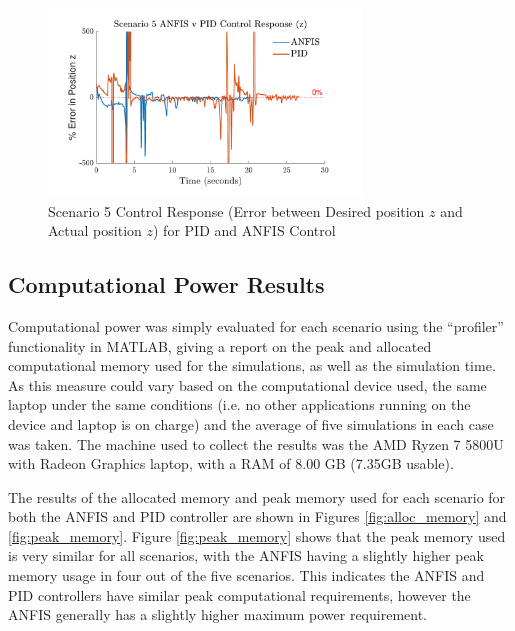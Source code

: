 \begin{figure}[H]
    \centering
    \begin{minipage}[b]{0.45\textwidth}
    \end{minipage}
    \hfill
    \begin{minipage}[b]{0.45\textwidth}
        \centering
        \includegraphics[height=5cm,keepaspectratio]{img/Scenario 5 Error in z Position.pdf}
        \caption{Scenario 5 Control Response (Error between Desired position $z$ and Actual position $z$) for PID and ANFIS Control}
        \label{fig:Response5z}
    \end{minipage}
    \hfill
    \begin{minipage}[b]{0.45\textwidth}
    \end{minipage}
\end{figure}

\subsection{Computational Power Results}
Computational power was simply evaluated for each scenario using the ``profiler'' functionality in MATLAB, giving a report on the peak and allocated computational memory used for the simulations, as well as the simulation time. As this measure could vary based on the computational device used, the same laptop under the same conditions (i.e. no other applications running on the device and laptop is on charge) and the average of five simulations in each case was taken. The machine used to collect the results was the AMD Ryzen 7 5800U with Radeon Graphics laptop, with a RAM of 8.00 GB (7.35GB usable). 

The results of the allocated memory and peak memory used for each scenario for both the ANFIS and PID controller are shown in Figures \ref{fig:alloc_memory} and \ref{fig:peak_memory}. Figure \ref{fig:peak_memory} shows that the peak memory used is very similar for all scenarios, with the ANFIS having a slightly higher peak memory usage in four out of the five scenarios. This indicates the ANFIS and PID controllers have similar peak computational requirements, however the ANFIS generally has a slightly higher maximum power requirement. 

